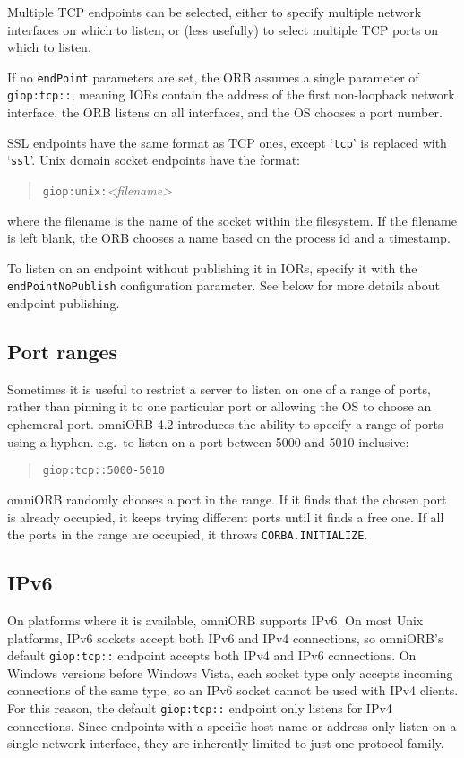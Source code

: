 \documentclass[11pt,oneside,a4paper]{book}
\newcommand{\code}[1]{\texttt{#1}}
\begin{document}
Multiple TCP endpoints can be selected, either to specify multiple
network interfaces on which to listen, or (less usefully) to select
multiple TCP ports on which to listen.

If no \code{endPoint} parameters are set, the ORB assumes a single
parameter of \code{giop:tcp::}, meaning IORs contain the address of
the first non-loopback network interface, the ORB listens on all
interfaces, and the OS chooses a port number.

SSL endpoints have the same format as TCP ones, except `\code{tcp}'
is replaced with `\code{ssl}'. Unix domain socket endpoints have the
format:

\begin{quote}
\code{giop:unix:}\textit{<filename>}
\end{quote}

\noindent where the filename is the name of the socket within the
filesystem. If the filename is left blank, the ORB chooses a name
based on the process id and a timestamp.

To listen on an endpoint without publishing it in IORs, specify it
with the \code{endPointNoPublish} configuration parameter. See below
for more details about endpoint publishing.


\subsection{Port ranges}

Sometimes it is useful to restrict a server to listen on one of a
range of ports, rather than pinning it to one particular port or
allowing the OS to choose an ephemeral port. omniORB 4.2 introduces
the ability to specify a range of ports using a hyphen. e.g.\ to
listen on a port between 5000 and 5010 inclusive:

\begin{quote}
\code{giop:tcp::5000-5010}
\end{quote}

omniORB randomly chooses a port in the range. If it finds that the
chosen port is already occupied, it keeps trying different ports until
it finds a free one. If all the ports in the range are occupied, it
throws \code{CORBA.INITIALIZE}.


\subsection{IPv6}

On platforms where it is available, omniORB supports IPv6. On most
Unix platforms, IPv6 sockets accept both IPv6 and IPv4 connections, so
omniORB's default \code{giop:tcp::} endpoint accepts both IPv4 and
IPv6 connections. On Windows versions before Windows Vista, each
socket type only accepts incoming connections of the same type, so an
IPv6 socket cannot be used with IPv4 clients. For this reason, the
default \code{giop:tcp::} endpoint only listens for IPv4 connections.
Since endpoints with a specific host name or address only listen on a
single network interface, they are inherently limited to just one
protocol family.
\end{document}
